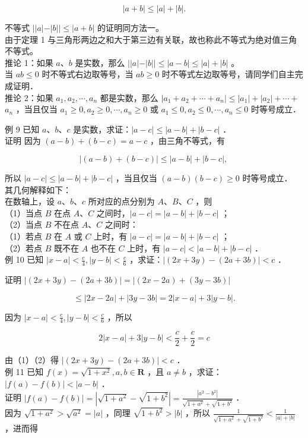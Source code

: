 \documentclass[10pt]{article}
\begin{document}
\[
|a+b| \leqslant|a|+|b| .
\]

不等式 \(||a|-|b|| \leqslant|a+b|\) 的证明同方法一。\\
由于定理 1 与三角形两边之和大于第三边有关联，故也称此不等式为绝对值三角不等式。\\
推论 1：如果 \(a 、 b\) 是实数，那么 \(||a|-|b|| \leqslant|a-b| \leqslant|a|+|b|\) 。\\
当 \(a b \leqslant 0\) 时不等式右边取等号，当 \(a b \geqslant 0\) 时不等式左边取等号，请同学们自主完成证明．\\
推论 2：如果 \(a_{1}, a_{2}, \cdots, a_{n}\) 都是实数，那么 \(\left|a_{1}+a_{2}+\cdots+a_{n}\right| \leqslant\left|a_{1}\right|+\left|a_{2}\right|+\cdots+\) \(a_{n}\) ，当且仅当 \(a_{1} \geqslant 0, a_{2} \geqslant 0, \cdots, a_{n} \geqslant 0\) 或 \(a_{1} \leqslant 0, a_{2} \leqslant 0, \cdots, a_{n} \leqslant 0\) 时等号成立．

例 9 已知 \(a 、 b 、 c\) 是实数，求证：\(|a-c| \leqslant|a-b|+|b-c|\) ．\\
证明 因为 \((a-b)+(b-c)=a-c\) ，由三角不等式，有

\[
|(a-b)+(b-c)| \leqslant|a-b|+|b-c| \text {, }
\]

所以 \(|a-c| \leqslant|a-b|+|b-c|\) ，当且仅当 \((a-b)(b-c) \geqslant 0\) 时等号成立．\\
其几何解释如下：\\
在数轴上，设 \(a 、 b 、 c\) 所对应的点分别为 \(A 、 B 、 C\) ，则\\
（1）当点 \(B\) 在点 \(A 、 C\) 之间时，\(|a-c|=|a-b|+|b-c|\) ；\\
（2）当点 \(B\) 不在点 \(A 、 C\) 之间时：\\
（1）若点 \(B\) 在 \(A\) 或 \(C\) 上时，有 \(|a-c|=|a-b|+|b-c|\) ；\\
（2）若点 \(B\) 既不在 \(A\) 也不在 \(C\) 上时，有 \(|a-c|<|a-b|+|b-c|\) ．\\
例 10 已知 \(|x-a|<\frac{c}{4},|y-b|<\frac{c}{6}\) ，求证：\(|(2 x+3 y)-(2 a+3 b)|<c\) ．

证明 \(|(2 x+3 y)-(2 a+3 b)|=|(2 x-2 a)+(3 y-3 b)|\)

\[
\leqslant|2 x-2 a|+|3 y-3 b|=2|x-a|+3|y-b| .
\]

因为 \(|x-a|<\frac{c}{4},|y-b|<\frac{c}{6}\) ，所以

\[
2|x-a|+3|y-b|<\frac{c}{2}+\frac{c}{2}=c
\]

由（1）（2）得 \(|(2 x+3 y)-(2 a+3 b)|<c\) ．\\
例 11 已知 \(f(x)=\sqrt{1+x^{2}}, a, b \in \mathbf{R}\) ，且 \(a \neq b\) ，求证：\(|f(a)-f(b)|<|a-b|\) ．\\
证明 \(|f(a)-f(b)|=\left|\sqrt{1+a^{2}}-\sqrt{1+b^{2}}\right|=\frac{\left|a^{2}-b^{2}\right|}{\sqrt{1+a^{2}}+\sqrt{1+b^{2}}}\) ．\\
因为 \(\sqrt{1+a^{2}}>\sqrt{a^{2}}=|a|\) ，同理 \(\sqrt{1+b^{2}}>|b|\) ，所以 \(\frac{1}{\sqrt{1+a^{2}}+\sqrt{1+b^{2}}}<\frac{1}{|a|+|b|}\) ，进而得
\end{document}
